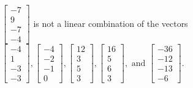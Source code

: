 \begin{exercise}
\begin{exerciseStatement}
  \end{exerciseStatement}
  \begin{exerciseAnswer}
   \(\left[\begin{array}{c}
-7 \\
9 \\
-7 \\
-4
\end{array}\right]\) 
  	 is not  
	a linear combination of the vectors \(\left[\begin{array}{c}
-4 \\
1 \\
-3 \\
-3
\end{array}\right] , \left[\begin{array}{c}
-4 \\
-2 \\
-1 \\
0
\end{array}\right] , \left[\begin{array}{c}
12 \\
3 \\
5 \\
3
\end{array}\right] , \left[\begin{array}{c}
16 \\
5 \\
6 \\
3
\end{array}\right] , \text{ and } \left[\begin{array}{c}
-36 \\
-12 \\
-13 \\
-6
\end{array}\right]\).

	
  


  \end{exerciseAnswer}
\end{exercise}
